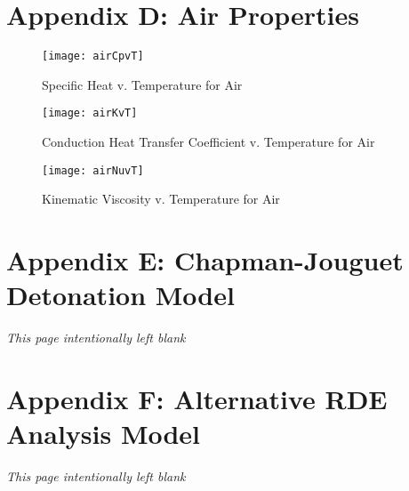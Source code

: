 \newpage
\section{Appendix D: Air Properties}
\begin{figure}[H]
\begin{center}
\texttt{[image: airCpvT]}
\caption{Specific Heat v. Temperature for Air}
\label{fig:airCpvT}
\end{center}
\end{figure}


\begin{figure}[H]
\begin{center}
\texttt{[image: airKvT]}
\caption{Conduction Heat Transfer Coefficient v. Temperature for Air}
\label{fig:airKvT}
\end{center}
\end{figure}

\begin{figure}[H]
\begin{center}
\texttt{[image: airNuvT]}
\caption{Kinematic Viscosity v. Temperature for Air}
\label{fig:airNuvT}
\end{center}
\end{figure}

\newpage
\section{Appendix E: Chapman-Jouguet Detonation Model}
\textit{This page intentionally left blank}

\newpage
\section{Appendix F: Alternative RDE Analysis Model}
\textit{This page intentionally left blank}

